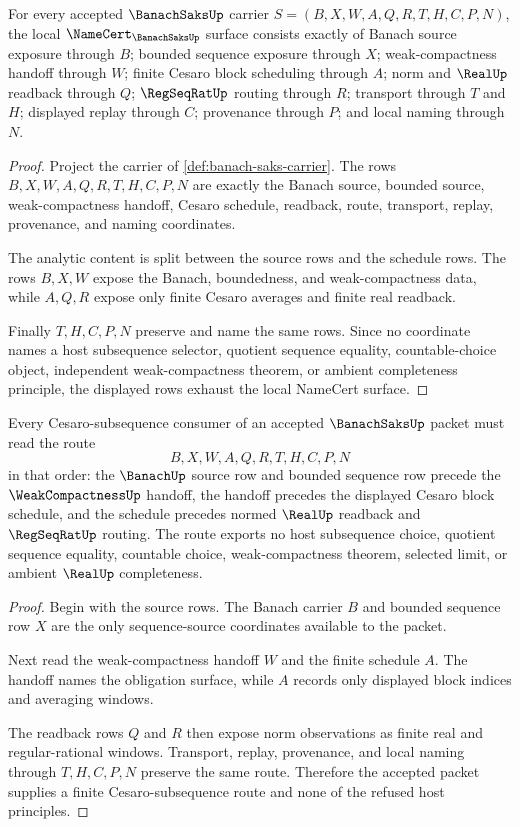 \begin{theorem}
\label{thm:banach-saks-namecert-obligations}
For every accepted $\BanachSaksUp$ carrier $S=(B,X,W,A,Q,R,T,H,C,P,N)$, the local $\NameCert_{\BanachSaksUp}$ surface consists exactly of Banach source exposure through $B$; bounded sequence exposure through $X$; weak-compactness handoff through $W$; finite Cesaro block scheduling through $A$; norm and $\RealUp$ readback through $Q$; $\RegSeqRatUp$ routing through $R$; transport through $T$ and $H$; displayed replay through $C$; provenance through $P$; and local naming through $N$.
\end{theorem}
\begin{proof}
Project the carrier of \autoref{def:banach-saks-carrier}. The rows $B,X,W,A,Q,R,T,H,C,P,N$ are exactly the Banach source, bounded source, weak-compactness handoff, Cesaro schedule, readback, route, transport, replay, provenance, and naming coordinates.

The analytic content is split between the source rows and the schedule rows. The rows $B,X,W$ expose the Banach, boundedness, and weak-compactness data, while $A,Q,R$ expose only finite Cesaro averages and finite real readback.

Finally $T,H,C,P,N$ preserve and name the same rows. Since no coordinate names a host subsequence selector, quotient sequence equality, countable-choice object, independent weak-compactness theorem, or ambient completeness principle, the displayed rows exhaust the local NameCert surface.
\end{proof}

\begin{theorem}
\label{thm:banach-saks-cesaro-subsequence-route}
Every Cesaro-subsequence consumer of an accepted $\BanachSaksUp$ packet must read the route
$$
B,X,W,A,Q,R,T,H,C,P,N
$$
in that order: the $\BanachUp$ source row and bounded sequence row precede the $\WeakCompactnessUp$ handoff, the handoff precedes the displayed Cesaro block schedule, and the schedule precedes normed $\RealUp$ readback and $\RegSeqRatUp$ routing. The route exports no host subsequence choice, quotient sequence equality, countable choice, weak-compactness theorem, selected limit, or ambient $\RealUp$ completeness.
\end{theorem}
\begin{proof}
Begin with the source rows. The Banach carrier $B$ and bounded sequence row $X$ are the only sequence-source coordinates available to the packet.

Next read the weak-compactness handoff $W$ and the finite schedule $A$. The handoff names the obligation surface, while $A$ records only displayed block indices and averaging windows.

The readback rows $Q$ and $R$ then expose norm observations as finite real and regular-rational windows. Transport, replay, provenance, and local naming through $T,H,C,P,N$ preserve the same route. Therefore the accepted packet supplies a finite Cesaro-subsequence route and none of the refused host principles.
\end{proof}

